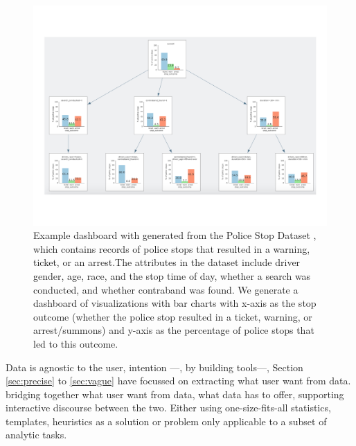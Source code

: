 \begin{figure}[h!]
\label{fig:modalities}
\centering
\includegraphics[width=0.7\linewidth]{figures/storyboard.pdf}
\caption{Example dashboard with generated from the Police Stop Dataset \cite{police}, which contains records of police stops that resulted in a warning, ticket, or an arrest.The attributes in the dataset include driver gender, age, race, and the stop time of day, whether a search was conducted, and whether contraband was found. We generate a dashboard of visualizations with bar charts with x-axis as the stop outcome (whether the police stop resulted in a ticket, warning, or arrest/summons) and y-axis as the percentage of police stops that led to this outcome.}
\end{figure}

Data is agnostic to the user, intention ---, by building tools---, Section \ref{sec:precise} to \ref{sec:vague} have focussed on extracting what user want from data. bridging together what user want from data, what data has to offer, supporting interactive discourse between the two. 
 Either using one-size-fits-all statistics, templates, heuristics as a solution or problem only applicable to a subset of analytic tasks\cite{Vartak2015,Vartak2017}. 

